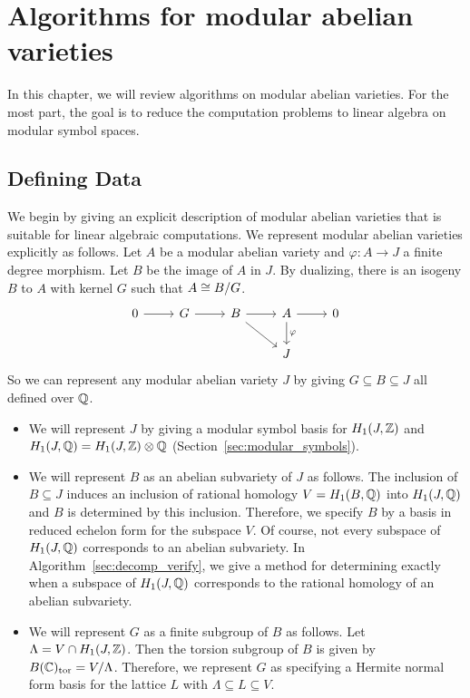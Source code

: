\chapter{Algorithms for modular abelian varieties}%
\label{chap:algorithms}

In this chapter, we will review algorithms on modular abelian varieties. For
the most part, the goal is to reduce the computation problems to linear algebra
on modular symbol spaces.

\section{Defining Data}%
\label{sec:defining_data}

We begin by giving an explicit description of modular abelian varieties that is
suitable for linear algebraic computations. We represent modular abelian
varieties explicitly as follows. Let $A$ be a modular abelian variety and
$\varphi:A\to J$ a finite degree morphism. Let $B$ be the image of $A$ in $J$.
By dualizing, there is an isogeny $B$ to $A$ with kernel $G$ such that $A\cong
B/G$.
\begin{equation*}
    \label{eq:defining_data}
    \begin{tikzcd}
        0 \arrow[r]
            &
            G \arrow[r]
            &
            B \arrow[r]\arrow[rd]
            &
            A \arrow[d, "\varphi"]
            \arrow[r]
            &0
            \\
            &
            &
            &
            J
            &
    \end{tikzcd}
\end{equation*}
So we can represent any modular abelian variety $J$ by giving $G\subseteq
B\subseteq J$ all defined over $\mathbb{Q}$.

\begin{itemize}
    \item
        We will represent $J$ by giving a modular
        symbol basis for $H_1(J, \mathbb{Z})$ and $H_1(J, \mathbb{Q}) = H_1(J, \mathbb{Z})\otimes
        \mathbb{Q}$ (Section~\ref{sec:modular_symbols}).
    \item
        We will represent $B$ as an abelian subvariety of $J$ as follows. The
        inclusion of $B\subseteq J$ induces an inclusion of rational homology
        $V=H_1(B, \mathbb{Q})$ into $H_1(J, \mathbb{Q})$ and $B$ is determined by this
        inclusion. Therefore, we specify $B$ by a basis in reduced echelon form
        for the subspace $V$. Of course, not every subspace of $H_1(J, \mathbb{Q})$
        corresponds to an abelian subvariety. In
        Algorithm~\ref{sec:decomp_verify}, we give a method for determining
        exactly when a subspace of $H_1(J, \mathbb{Q})$ corresponds to the rational
        homology of an abelian subvariety.
    \item
        We will represent $G$ as a finite subgroup of $B$ as follows. Let
        $\Lambda=V\cap H_1(J, \mathbb{Z})$. Then the torsion subgroup of $B$ is given
        by $B(\mathbb{C})_{\mathrm{tor}}=V/\Lambda$. Therefore, we represent $G$ as specifying a
        Hermite normal form basis for the lattice $L$ with $\Lambda \subseteq L
        \subseteq V$.
\end{itemize}

